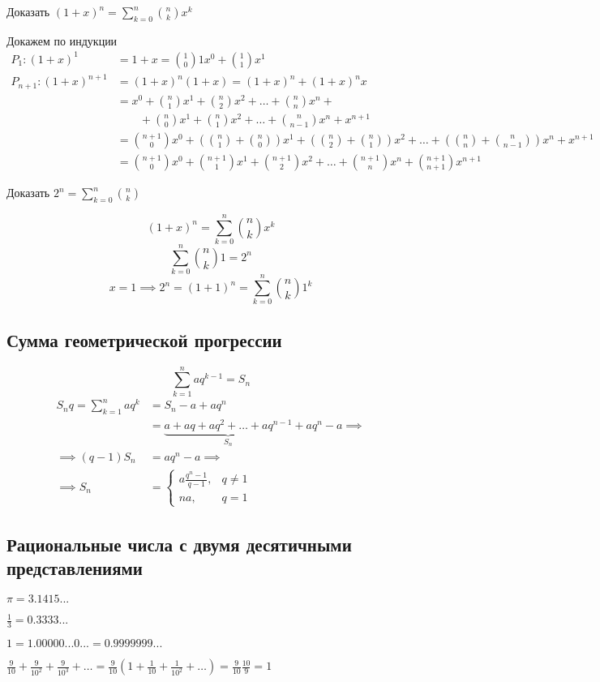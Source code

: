 \begin{problem}
	Доказать \((1 + x)^n = \sum^n_{k = 0} \binom{n}{k} x^k \)
\end{problem}
Докажем по индукции
\begin{align*}
	P_1 : (1 + x)^1 &= 1 + x = \binom{1}{0}1 x^0 + \binom{1}{1} x^1 \\
	P_{n+1} : (1 + x)^{n + 1} &=
	(1 + x)^n (1 + x) = (1 + x)^n + (1 + x)^n x \\
	&= x^0 + \binom{n}{1} x^1 + \binom{n}{2} x^2 + \dots + \binom{n}{n}x^n + \\
	&\qquad + \binom{n}{0} x^1 + \binom{n}{1} x^2 + \dots + \binom{n}{n - 1}x^n + x^{n + 1} \\
	&= \binom{n + 1}{0} x^0 + \left(\binom{n}{1} + \binom{n}{0} \right) x^1 + \left(\binom{n}{2} + \binom{n}{1} \right) x^2 + \dots + \left( \binom{n}{n} + \binom{n}{n - 1} \right) x^n + x^{n + 1} \\ 
	&= \binom{n + 1}{0} x^0 + \binom{n + 1}{1} x^1 + \binom{n + 1}{2} x^2 + \dots + \binom{n + 1}{n} x^n + \binom{n + 1}{n + 1} x^{n + 1}
\end{align*}

\begin{problem}
	Доказать \( 2^n  = \sum_{k = 0}^n \binom{n}{k} \)
\end{problem}
\[ (1 + x)^n = \sum^n_{k = 0} \binom{n}{k} x^k \]
\[ \sum^n_{k = 0} \binom{n}{k} 1 = 2^n \]
\[ x = 1 \implies 2^n = (1 + 1)^n = \sum^n_{k=0} \binom{n}{k} 1^k \]

\subsection{Сумма геометрической прогрессии}

\[ \sum_{k=1}^n a q^{k - 1} = S_n \]
\begin{align*}
	S_n q = \sum_{k = 1}^n a q^k &= S_n - a + a q^n \\
	&= \underbrace{a + aq + aq^2 + \dots + aq^{n-1}}_{S_n} + aq^n - a \implies \\
	\implies (q - 1) S_n &= a q^n - a \implies \\
	\implies S_n &= 
	\begin{cases}
		a \frac{q^n - 1}{q - 1}, & q \neq 1 \\
		na, & q = 1
	\end{cases}
\end{align*}

\subsection{Рациональные числа с двумя десятичными представлениями}

\( \pi = 3.1415... \)

\( \frac{1}{3} = 0.3333...\)

\( 1 = 1.00000...{}0... = 0.9999999... \)

\( 
	\frac{9}{10} + \frac{9}{10^2} + \frac{9}{10^3} + \dots  
	= \frac{9}{10} (1 + \frac{1}{10} + \frac{1}{10^2} + \dots)
	= \frac{9}{10}\frac{10}{9} = 1
\)


